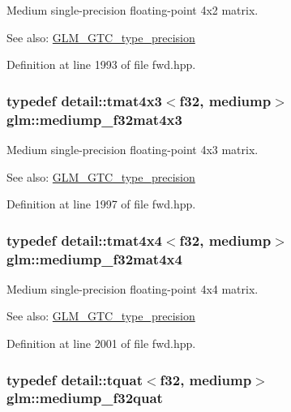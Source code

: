Medium single-precision floating-point 4x2 matrix. \begin{Desc}
\item[See also:]\hyperlink{group__gtc__type__precision}{GLM\_\-GTC\_\-type\_\-precision} \end{Desc}


Definition at line 1993 of file fwd.hpp.\hypertarget{group__gtc__type__precision_g31635d753ab8a19fdaa80d2b89e90c54}{
\subsubsection[mediump\_\-f32mat4x3]{\setlength{\rightskip}{0pt plus 5cm}typedef detail::tmat4x3$<$f32, mediump$>$ {\bf glm::mediump\_\-f32mat4x3}}}
\label{group__gtc__type__precision_g31635d753ab8a19fdaa80d2b89e90c54}


Medium single-precision floating-point 4x3 matrix. \begin{Desc}
\item[See also:]\hyperlink{group__gtc__type__precision}{GLM\_\-GTC\_\-type\_\-precision} \end{Desc}


Definition at line 1997 of file fwd.hpp.\hypertarget{group__gtc__type__precision_g8f83086fffe71f9cd15e75a1de101ba6}{
\subsubsection[mediump\_\-f32mat4x4]{\setlength{\rightskip}{0pt plus 5cm}typedef detail::tmat4x4$<$f32, mediump$>$ {\bf glm::mediump\_\-f32mat4x4}}}
\label{group__gtc__type__precision_g8f83086fffe71f9cd15e75a1de101ba6}


Medium single-precision floating-point 4x4 matrix. \begin{Desc}
\item[See also:]\hyperlink{group__gtc__type__precision}{GLM\_\-GTC\_\-type\_\-precision} \end{Desc}


Definition at line 2001 of file fwd.hpp.\hypertarget{group__gtc__type__precision_gb038e3482ca401bca2b2634c96f44f09}{
\subsubsection[mediump\_\-f32quat]{\setlength{\rightskip}{0pt plus 5cm}typedef detail::tquat$<$f32, mediump$>$ {\bf glm::mediump\_\-f32quat}}}
\label{group__gtc__type__precision_gb038e3482ca401bca2b2634c96f44f09}


